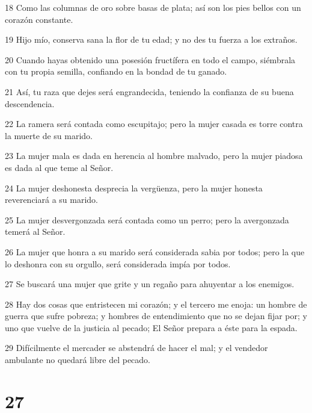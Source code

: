\par 18 Como las columnas de oro sobre basas de plata; así son los pies bellos con un corazón constante.
\par 19 Hijo mío, conserva sana la flor de tu edad; y no des tu fuerza a los extraños.
\par 20 Cuando hayas obtenido una posesión fructífera en todo el campo, siémbrala con tu propia semilla, confiando en la bondad de tu ganado.
\par 21 Así, tu raza que dejes será engrandecida, teniendo la confianza de su buena descendencia.
\par 22 La ramera será contada como escupitajo; pero la mujer casada es torre contra la muerte de su marido.
\par 23 La mujer mala es dada en herencia al hombre malvado, pero la mujer piadosa es dada al que teme al Señor.
\par 24 La mujer deshonesta desprecia la vergüenza, pero la mujer honesta reverenciará a su marido.
\par 25 La mujer desvergonzada será contada como un perro; pero la avergonzada temerá al Señor.
\par 26 La mujer que honra a su marido será considerada sabia por todos; pero la que lo deshonra con su orgullo, será considerada impía por todos.
\par 27 Se buscará una mujer que grite y un regaño para ahuyentar a los enemigos.
\par 28 Hay dos cosas que entristecen mi corazón; y el tercero me enoja: un hombre de guerra que sufre pobreza; y hombres de entendimiento que no se dejan fijar por; y uno que vuelve de la justicia al pecado; El Señor prepara a éste para la espada.
\par 29 Difícilmente el mercader se abstendrá de hacer el mal; y el vendedor ambulante no quedará libre del pecado.

\chapter{27}

